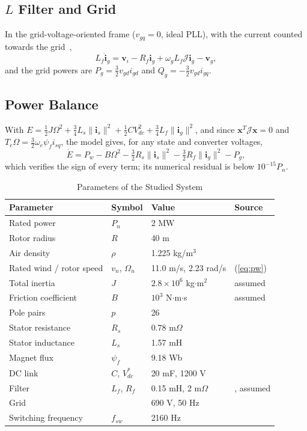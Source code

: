 \documentclass[conference]{IEEEtran}
\newcommand{\bv}[1]{\mathbf{#1}}
\newcommand{\Jm}{\boldsymbol{\mathcal{J}}}
\begin{document}
\subsection{$L$ Filter and Grid}
In the grid-voltage-oriented frame ($v_{gq}=0$, ideal PLL), with the current counted towards the
grid~\cite{aimene2022},
\begin{equation}
L_f\dot{\bv{i}}_g = \bv{v}_i - R_f\bv{i}_g + \omega_gL_f\Jm\bv{i}_g - \bv{v}_g ,
\label{eq:filter}
\end{equation}
and the grid powers are $P_g=\frac32v_{gd}i_{gd}$ and $Q_g=-\frac32v_{gd}i_{gq}$.

\subsection{Power Balance}
With $E=\frac12J\Omega^2+\frac34L_s\|\bv{i}_s\|^2+\frac12CV_{dc}^2+\frac34L_f\|\bv{i}_g\|^2$, and since
$\bv{x}^T\Jm\bv{x}=0$ and $T_e\Omega=\frac32\omega_e\psi_fi_{sq}$, the model gives, for any state and
converter voltages,
\begin{equation}
\dot E = P_w - B\Omega^2 - \tfrac32R_s\|\bv{i}_s\|^2 - \tfrac32R_f\|\bv{i}_g\|^2 - P_g ,
\label{eq:balance}
\end{equation}
which verifies the sign of every term; its numerical residual is below $10^{-15}P_n$.

\begin{table}[t]
\caption{Parameters of the Studied System}
\label{tab:param}
\centering
\footnotesize
\setlength{\tabcolsep}{3pt}
\begin{tabular}{llll}
\toprule
Parameter & Symbol & Value & Source\\
\midrule
Rated power & $P_n$ & 2 MW & \cite{hasan2021}\\
Rotor radius & $R$ & 40 m & \cite{rolan2009}\\
Air density & $\rho$ & 1.225 kg/m$^3$ & \cite{aimene2022}\\
Rated wind / rotor speed & $v_n$, $\Omega_n$ & 11.0 m/s, 2.23 rad/s & (\ref{eq:pw})\\
Total inertia & $J$ & $2.8\times10^6$ kg$\cdot$m$^2$ & assumed\\
Friction coefficient & $B$ & $10^3$ N$\cdot$m$\cdot$s & assumed\\
Pole pairs & $p$ & 26 & \cite{hasan2021}\\
Stator resistance & $R_s$ & 0.78 m$\Omega$ & \cite{hasan2021}\\
Stator inductance & $L_s$ & 1.57 mH & \cite{hasan2021}\\
Magnet flux & $\psi_f$ & 9.18 Wb & \cite{hasan2021}\\
DC link & $C$, $V_{dc}^*$ & 20 mF, 1200 V & \cite{hasan2021}\\
Filter & $L_f$, $R_f$ & 0.15 mH, 2 m$\Omega$ & \cite{hasan2021}, assumed\\
Grid & & 690 V, 50 Hz & \cite{hasan2021}\\
Switching frequency & $f_{sw}$ & 2160 Hz & \cite{hasan2021}\\
\bottomrule
\end{tabular}
\end{table}
\end{document}
